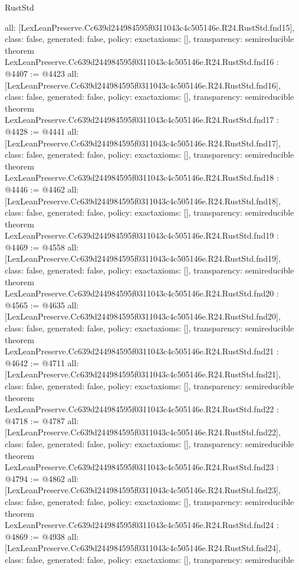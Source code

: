 \begin{lexlean}{RustStd}
\begin{coremodule}
{  all: [LexLeanPreserve.Cc639d244984595f0311043c4c505146e.R24.RustStd.fnd15],
  class: false,
  generated: false,
  policy: exact{axioms: []},
  transparency: semireducible
}
theorem LexLeanPreserve.Cc639d244984595f0311043c4c505146e.R24.RustStd.fnd16 : @4407 := @4423 {
  all: [LexLeanPreserve.Cc639d244984595f0311043c4c505146e.R24.RustStd.fnd16],
  class: false,
  generated: false,
  policy: exact{axioms: []},
  transparency: semireducible
}
theorem LexLeanPreserve.Cc639d244984595f0311043c4c505146e.R24.RustStd.fnd17 : @4428 := @4441 {
  all: [LexLeanPreserve.Cc639d244984595f0311043c4c505146e.R24.RustStd.fnd17],
  class: false,
  generated: false,
  policy: exact{axioms: []},
  transparency: semireducible
}
theorem LexLeanPreserve.Cc639d244984595f0311043c4c505146e.R24.RustStd.fnd18 : @4446 := @4462 {
  all: [LexLeanPreserve.Cc639d244984595f0311043c4c505146e.R24.RustStd.fnd18],
  class: false,
  generated: false,
  policy: exact{axioms: []},
  transparency: semireducible
}
theorem LexLeanPreserve.Cc639d244984595f0311043c4c505146e.R24.RustStd.fnd19 : @4469 := @4558 {
  all: [LexLeanPreserve.Cc639d244984595f0311043c4c505146e.R24.RustStd.fnd19],
  class: false,
  generated: false,
  policy: exact{axioms: []},
  transparency: semireducible
}
theorem LexLeanPreserve.Cc639d244984595f0311043c4c505146e.R24.RustStd.fnd20 : @4565 := @4635 {
  all: [LexLeanPreserve.Cc639d244984595f0311043c4c505146e.R24.RustStd.fnd20],
  class: false,
  generated: false,
  policy: exact{axioms: []},
  transparency: semireducible
}
theorem LexLeanPreserve.Cc639d244984595f0311043c4c505146e.R24.RustStd.fnd21 : @4642 := @4711 {
  all: [LexLeanPreserve.Cc639d244984595f0311043c4c505146e.R24.RustStd.fnd21],
  class: false,
  generated: false,
  policy: exact{axioms: []},
  transparency: semireducible
}
theorem LexLeanPreserve.Cc639d244984595f0311043c4c505146e.R24.RustStd.fnd22 : @4718 := @4787 {
  all: [LexLeanPreserve.Cc639d244984595f0311043c4c505146e.R24.RustStd.fnd22],
  class: false,
  generated: false,
  policy: exact{axioms: []},
  transparency: semireducible
}
theorem LexLeanPreserve.Cc639d244984595f0311043c4c505146e.R24.RustStd.fnd23 : @4794 := @4862 {
  all: [LexLeanPreserve.Cc639d244984595f0311043c4c505146e.R24.RustStd.fnd23],
  class: false,
  generated: false,
  policy: exact{axioms: []},
  transparency: semireducible
}
theorem LexLeanPreserve.Cc639d244984595f0311043c4c505146e.R24.RustStd.fnd24 : @4869 := @4938 {
  all: [LexLeanPreserve.Cc639d244984595f0311043c4c505146e.R24.RustStd.fnd24],
  class: false,
  generated: false,
  policy: exact{axioms: []},
  transparency: semireducible
}
\end{coremodule}
\end{lexlean}
